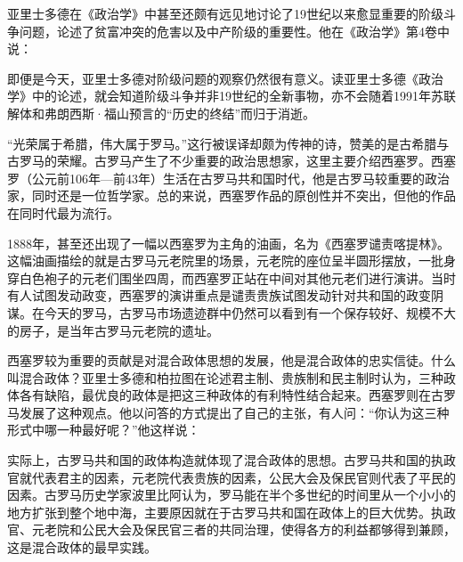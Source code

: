 亚里士多德在《政治学》中甚至还颇有远见地讨论了19世纪以来愈显重要的阶级斗争问题，论述了贫富冲突的危害以及中产阶级的重要性。他在《政治学》第4卷中说：


即便是今天，亚里士多德对阶级问题的观察仍然很有意义。读亚里士多德《政治学》中的论述，就会知道阶级斗争并非19世纪的全新事物，亦不会随着1991年苏联解体和弗朗西斯·福山预言的“历史的终结”而归于消逝。

“光荣属于希腊，伟大属于罗马。”这行被误译却颇为传神的诗，赞美的是古希腊与古罗马的荣耀。古罗马产生了不少重要的政治思想家，这里主要介绍西塞罗。西塞罗（公元前106年—前43年）生活在古罗马共和国时代，他是古罗马较重要的政治家，同时还是一位哲学家。总的来说，西塞罗作品的原创性并不突出，但他的作品在同时代最为流行。

1888年，甚至还出现了一幅以西塞罗为主角的油画，名为《西塞罗谴责喀提林》。这幅油画描绘的就是古罗马元老院里的场景，元老院的座位呈半圆形摆放，一批身穿白色袍子的元老们围坐四周，而西塞罗正站在中间对其他元老们进行演讲。当时有人试图发动政变，西塞罗的演讲重点是谴责贵族试图发动针对共和国的政变阴谋。在今天的罗马，古罗马市场遗迹群中仍然可以看到有一个保存较好、规模不大的房子，是当年古罗马元老院的遗址。

西塞罗较为重要的贡献是对混合政体思想的发展，他是混合政体的忠实信徒。什么叫混合政体？亚里士多德和柏拉图在论述君主制、贵族制和民主制时认为，三种政体各有缺陷，最优良的政体是把这三种政体的有利特性结合起来。西塞罗则在古罗马发展了这种观点。他以问答的方式提出了自己的主张，有人问：“你认为这三种形式中哪一种最好呢？”他这样说：


实际上，古罗马共和国的政体构造就体现了混合政体的思想。古罗马共和国的执政官就代表君主的因素，元老院代表贵族的因素，公民大会及保民官则代表了平民的因素。古罗马历史学家波里比阿认为，罗马能在半个多世纪的时间里从一个小小的地方扩张到整个地中海，主要原因就在于古罗马共和国在政体上的巨大优势。执政官、元老院和公民大会及保民官三者的共同治理，使得各方的利益都够得到兼顾，这是混合政体的最早实践。

